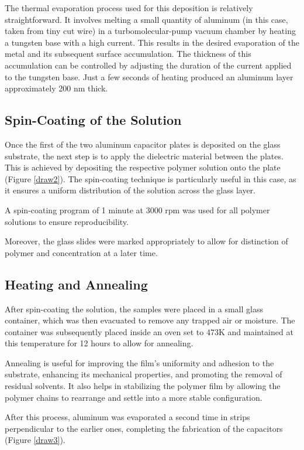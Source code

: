 The thermal evaporation process used for this deposition is relatively straightforward. It involves melting a small quantity of aluminum (in this case, taken from tiny cut wire) in a turbomolecular-pump vacuum chamber by heating a tungsten base with a high current. This results in the desired evaporation of the metal and its subsequent surface accumulation. The thickness of this accumulation can be controlled by adjusting the duration of the current applied to the tungsten base. Just a few seconds of heating produced an aluminum layer approximately 200 nm thick.
\subsection{Spin-Coating of the Solution}

Once the first of the two aluminum capacitor plates is deposited on the glass substrate, the next step is to apply the dielectric material between the plates. This is achieved by depositing the respective polymer solution onto the plate (Figure \ref{draw2}). The spin-coating technique is particularly useful in this case, as it ensures a uniform distribution of the solution across the glass layer.

A spin-coating program of 1 minute at 3000 rpm was used for all polymer solutions to ensure reproducibility.

Moreover, the glass slides were marked appropriately to allow for distinction of polymer and concentration at a later time.

\subsection{Heating and Annealing}

After spin-coating the solution, the samples were placed in a small glass container, which was then evacuated to remove any trapped air or moisture. The container was subsequently placed inside an oven set to 473K and maintained at this temperature for 12 hours to allow for annealing.

Annealing is useful for improving the film's uniformity and adhesion to the substrate, enhancing its mechanical properties, and promoting the removal of residual solvents. It also helps in stabilizing the polymer film by allowing the polymer chains to rearrange and settle into a more stable configuration.


After this process, aluminum was evaporated a second time in strips perpendicular to the earlier ones, completing the fabrication of the capacitors (Figure \ref{draw3}).


